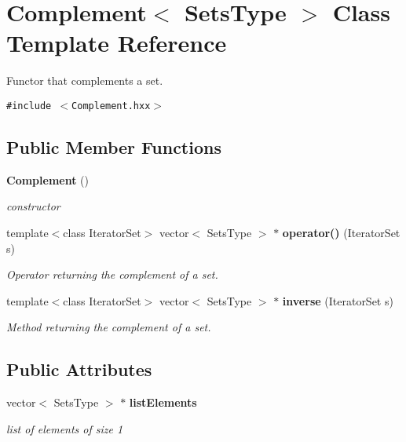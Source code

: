 \section{Complement$<$ Sets\-Type $>$ Class Template Reference}
\label{class_complement}
Functor that complements a set.  


{\tt \#include $<$Complement.hxx$>$}

\subsection*{Public Member Functions}
\begin{CompactItemize}
\item 
{\bf Complement} ()\label{class_complement_355fbb3afb3439453e2f5cbec085fd6f}

\begin{CompactList}\small\item\em constructor \item\end{CompactList}\item 
template$<$class Iterator\-Set$>$ vector$<$ Sets\-Type $>$ $\ast$ {\bf operator()} (Iterator\-Set s)
\begin{CompactList}\small\item\em Operator returning the complement of a set. \item\end{CompactList}\item 
template$<$class Iterator\-Set$>$ vector$<$ Sets\-Type $>$ $\ast$ {\bf inverse} (Iterator\-Set s)
\begin{CompactList}\small\item\em Method returning the complement of a set. \item\end{CompactList}\end{CompactItemize}
\subsection*{Public Attributes}
\begin{CompactItemize}
\item 
vector$<$ Sets\-Type $>$ $\ast$ {\bf list\-Elements}
\begin{CompactList}\small\item\em list of elements of size 1 \item\end{CompactList}\end{CompactItemize}



